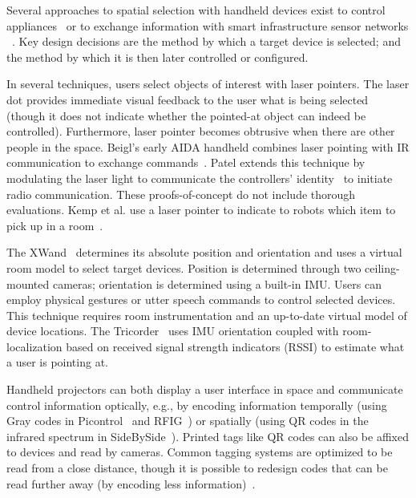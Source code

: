 \documentclass{sigchi}
\begin{document}
Several approaches to spatial selection with handheld devices exist to control appliances~\cite{beigl_point_1999,patel_2-way_2003,wilson_xwand:_2003,schmidt_picontrol:_2012} or to exchange information with smart infrastructure sensor networks ~\cite{lifton_tricorder:_2007,mittal_ubicorder:_2011,costanza_sensortune:_2010}. Key design decisions are the method by which a target device is selected; and the method by which it is then later controlled or configured.

In several techniques, users select objects of interest with laser pointers. The laser dot provides immediate visual feedback to the user what is being selected (though it does not indicate whether the pointed-at object can indeed be controlled). Furthermore, laser pointer becomes obtrusive when there are other people in the space. Beigl's early AIDA handheld combines laser pointing with IR communication to exchange commands~\cite{beigl_point_1999}. Patel extends this technique by modulating the laser light to communicate the controllers' identity~\cite{patel_2-way_2003} to initiate radio communication. These proofs-of-concept do not include thorough evaluations. Kemp et al. use a laser pointer to indicate to robots which item to pick up in a room~\cite{kemp_point-and-click_2008}. 

The XWand~\cite{wilson_xwand:_2003} determines its absolute position and orientation and uses a virtual room model to select target devices. Position is determined through two ceiling-mounted cameras; orientation is determined using a built-in IMU. Users can employ physical gestures or utter speech commands to control selected devices. This technique requires room instrumentation and an up-to-date virtual model of device locations. The Tricorder~\cite{lifton_tricorder:_2007} uses IMU orientation coupled with room-localization based on received signal strength indicators (RSSI) to estimate what a user is pointing at.

Handheld projectors can both display a user interface in space and communicate control information optically, e.g., by encoding information temporally (using Gray codes in Picontrol~\cite{schmidt_picontrol:_2012} and RFIG~\cite{raskar_rfig_2004}) or spatially (using QR codes in the infrared spectrum in SideBySide~\cite{willis_sidebyside:_2011}). Printed tags like QR codes can also be affixed to devices and read by cameras. Common tagging systems are optimized to be read from a close distance, though it is possible to redesign codes that can be read further away (by encoding less information)~\cite{cross_low-cost_2012}. 
\end{document}

